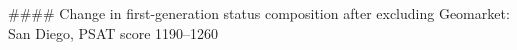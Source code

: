 #### Change in first-generation status composition after excluding Geomarket: San Diego, PSAT score 1190–1260
